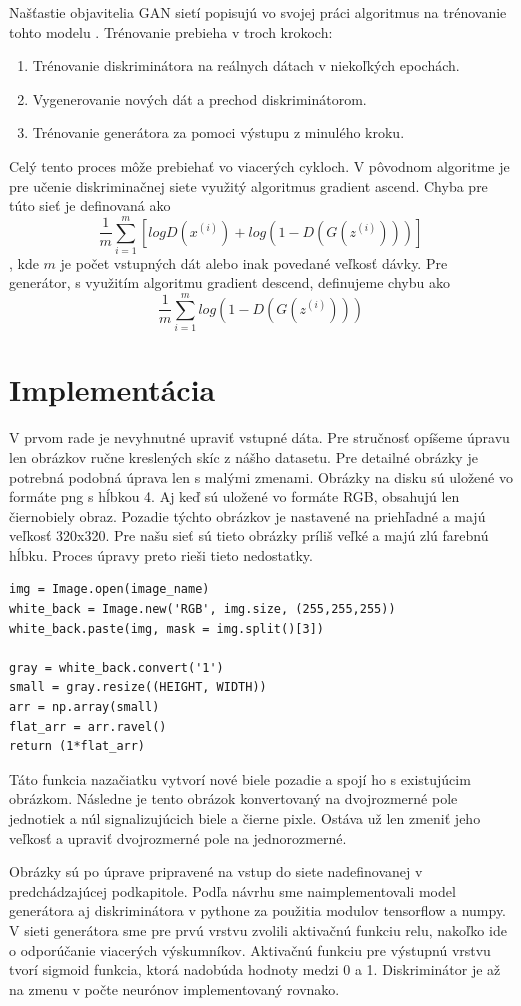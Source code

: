 Našťastie objavitelia GAN sietí popisujú vo svojej práci algoritmus na trénovanie tohto modelu \cite{GAN}.
Trénovanie prebieha v troch krokoch:
\begin{enumerate}
	\item Trénovanie diskriminátora na reálnych dátach v niekoľkých epochách.
	\item Vygenerovanie nových dát a prechod diskriminátorom.
	\item Trénovanie generátora za pomoci výstupu z minulého kroku.
\end{enumerate}
Celý tento proces môže prebiehať vo viacerých cykloch.
V pôvodnom algoritme je pre učenie diskriminačnej siete využitý algoritmus gradient ascend.
Chyba pre túto sieť je definovaná ako
\[\frac{1}{m}\sum_{i=1}^{m} [logD(x^{(i)}) + log(1 - D(G(z^{(i)})))]\]
, kde \(m\) je počet vstupných dát alebo inak povedané veľkosť dávky.
Pre generátor, s využitím algoritmu gradient descend, definujeme chybu ako
\[\frac{1}{m}\sum_{i=1}^{m} log(1 - D(G(z^{(i)})))\]

\section{Implementácia}
V prvom rade je nevyhnutné upraviť vstupné dáta.
Pre stručnosť opíšeme úpravu len obrázkov ručne kreslených skíc z nášho datasetu.
Pre detailné obrázky je potrebná podobná úprava len s malými zmenami.
Obrázky na disku sú uložené vo formáte png s hĺbkou 4.
Aj keď sú uložené vo formáte RGB, obsahujú len čiernobiely obraz.
Pozadie týchto obrázkov je nastavené na priehľadné a majú veľkosť 320x320.
Pre našu sieť sú tieto obrázky príliš veľké a majú zlú farebnú hĺbku.
Proces úpravy preto rieši tieto nedostatky.
\begin{verbatim}
img = Image.open(image_name)
white_back = Image.new('RGB', img.size, (255,255,255))
white_back.paste(img, mask = img.split()[3])

gray = white_back.convert('1')
small = gray.resize((HEIGHT, WIDTH))
arr = np.array(small)
flat_arr = arr.ravel()
return (1*flat_arr)
\end{verbatim}
Táto funkcia nazačiatku vytvorí nové biele pozadie a spojí ho s existujúcim obrázkom.
Následne je tento obrázok konvertovaný na dvojrozmerné pole jednotiek a núl signalizujúcich biele a čierne pixle.
Ostáva už len zmeniť jeho veľkosť a upraviť dvojrozmerné pole na jednorozmerné.

Obrázky sú po úprave pripravené na vstup do siete nadefinovanej v predchádzajúcej podkapitole.
Podľa návrhu sme naimplementovali model generátora aj diskriminátora v pythone za použitia modulov tensorflow a numpy.
V sieti generátora sme pre prvú vrstvu zvolili aktivačnú funkciu relu, nakoľko ide o odporúčanie viacerých výskumníkov.
Aktivačnú funkciu pre výstupnú vrstvu tvorí sigmoid funkcia, ktorá nadobúda hodnoty medzi 0 a 1.
Diskriminátor je až na zmenu v počte neurónov implementovaný rovnako.


